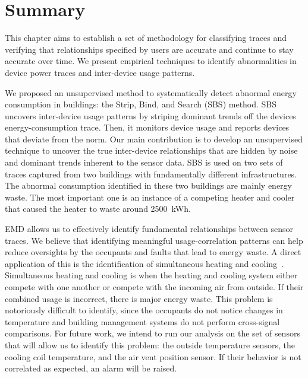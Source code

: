 \section{Summary}



This chapter aims to establish a set of methodology for classifying traces and verifying that relationships specified by
users are accurate and continue to stay accurate over time.  We present empirical techniques to identify abnormalities in 
device power traces and inter-device usage patterns.

We proposed an unsupervised method to systematically detect abnormal energy consumption in buildings: the Strip, Bind, and Search (SBS) method.
SBS uncovers inter-device usage patterns by striping dominant trends off the devices energy-consumption trace.
Then, it monitors device usage and reports devices that deviate from the norm.  
Our main contribution is to develop an unsupervised technique to uncover the true inter-device relationships that are hidden by noise and 
dominant trends inherent to the sensor data.  
SBS is used on two sets of traces captured from two buildings with fundamentally different infrastructures.
The abnormal consumption identified in these two buildings are mainly energy waste.
The most important one is an instance of a competing heater and cooler that caused the heater to waste around 2500~kWh.



EMD allows us to effectively identify fundamental relationships between sensor traces.
We believe that identifying meaningful usage-correlation patterns can help reduce oversights
by the occupants and faults that lead to energy waste.  A direct application of this is the identification
of simultaneous heating and cooling~\cite{simheatcool}.  Simultaneous heating and cooling is when the heating
and cooling system either compete with one another or compete with the incoming air from outside.  If
their combined usage is incorrect, there is major energy waste.
This problem is notoriously difficult to identify, since the occupants do not notice
changes in temperature and building management systems do not perform cross-signal comparisons.  For 
future work, we intend to run our analysis on the set of sensors that will
allow us to identify this problem: the outside temperature sensors, the cooling
coil temperature, and the air vent position sensor.  If their behavior
is not correlated as expected, an alarm will be raised.

